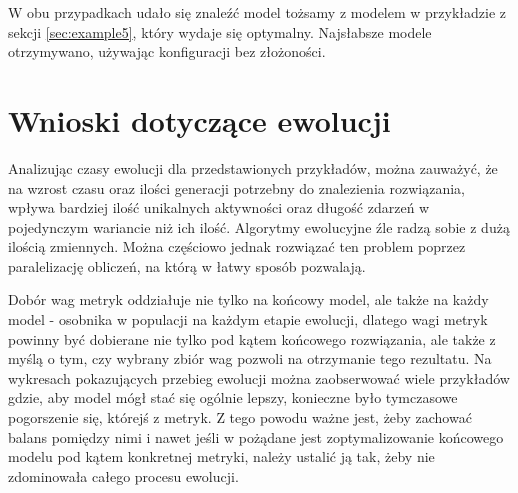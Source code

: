 W obu przypadkach udało się znaleźć model tożsamy z modelem w przykładzie z sekcji \ref{sec:example5}, który wydaje się optymalny. Najsłabsze modele otrzymywano, używając konfiguracji bez złożoności.

\section{Wnioski dotyczące ewolucji}
Analizując czasy ewolucji dla przedstawionych przykładów, można zauważyć, że na wzrost czasu oraz ilości generacji potrzebny do znalezienia rozwiązania, wpływa bardziej ilość unikalnych aktywności oraz długość zdarzeń w pojedynczym wariancie niż ich ilość. Algorytmy ewolucyjne źle radzą sobie z dużą ilością zmiennych. Można częściowo jednak rozwiązać ten problem poprzez paralelizację obliczeń, na którą w łatwy sposób pozwalają. 

Dobór wag metryk oddziałuje nie tylko na końcowy model, ale także na każdy model - osobnika w populacji na każdym etapie ewolucji, dlatego wagi metryk powinny być dobierane nie tylko pod kątem końcowego rozwiązania, ale także z myślą o tym, czy wybrany zbiór wag pozwoli na otrzymanie tego rezultatu. Na wykresach pokazujących przebieg ewolucji można zaobserwować wiele przykładów gdzie, aby model mógł stać się ogólnie lepszy, konieczne było tymczasowe pogorszenie się, którejś z metryk. Z tego powodu ważne jest, żeby zachować balans pomiędzy nimi i nawet jeśli w pożądane jest zoptymalizowanie końcowego modelu pod kątem konkretnej metryki, należy ustalić ją tak, żeby nie zdominowała całego procesu ewolucji. 

